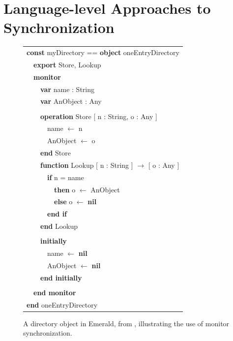\documentclass[12pt,twoside]{article}
\newcommand{\sis}{\linespread{1.0}\setlength{\baselineskip}{0.8\baselineskip}}
\begin{document}
\section{Language-level Approaches to \\Synchronization}
\begin{figure}
{\it\sis%
\begin{tabular}{l}\sis%
{\bf const} myDirectory == {\bf object} oneEntryDirectory\\
~~{\bf export} Store, Lookup\\
~~{\bf monitor}\\
~~~~{\bf var} name : String\\
~~~~{\bf var} AnObject : Any\\
\\
~~~~{\bf operation} Store [ n : String, o : Any ]\\
~~~~~~name $\gets$ n\\
~~~~~~AnObject $\gets$ o\\
~~~~{\bf end} Store
\\
~~~~{\bf function} Lookup [ n : String ] $\to$ [ o : Any ]\\
~~~~~~{\bf if} n = name\\
~~~~~~~~{\bf then} o $\gets$ AnObject\\
~~~~~~~~{\bf else} o $\gets$ {\bf nil}\\
~~~~~~{\bf end if}\\
~~~~{\bf end} Lookup\\
\\
~~~~{\bf initially}\\
~~~~~~name $\gets$ {\bf nil}\\
~~~~~~AnObject $\gets$ {\bf nil}\\
~~~~{\bf end initially}\\
\\
~~{\bf end monitor}\\
{\bf end} oneEntryDirectory
\end{tabular}
}
\caption{A directory object in Emerald, from \cite{BlackHuJuLe86},
  illustrating the use of monitor synchronization.}
\label{fig:emerald-dir}
\end{figure}
\end{document}
